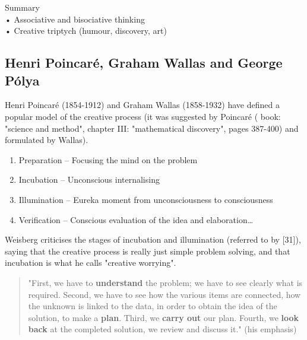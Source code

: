 \begin{shaded}
  Summary\\
  •	Associative and bisociative thinking\\
  •	Creative triptych (humour, discovery, art)
\end{shaded}

\subsection{Henri Poincaré, Graham Wallas and George Pólya}

Henri Poincaré (1854-1912) \citep{Poincare2001} and Graham Wallas (1858-1932) \citep{Wallas1926} have defined a popular model \citep{Boden2003, Koestler1964, Partridge1994} of the creative process (it was suggested by Poincaré  (\citep{Poincare2001} book: "science and method", chapter III: "mathematical discovery", pages 387-400) and formulated by Wallas).

\begin{enumerate}
  \item Preparation – Focusing the mind on the problem
  \item Incubation – Unconscious internalising
  \item Illumination – Eureka moment from unconsciousness to consciousness
  \item Verification – Conscious evaluation of the idea and elaboration…
\end{enumerate}

Weisberg criticises the stages of incubation and illumination (referred to by [31]), saying that the creative process is really just simple problem solving, and that incubation is what he calls "creative worrying".

\begin{quote}
  "First, we have to \textbf{understand} the problem; we have to see clearly what is required. Second, we have to see how the various items are connected, how the unknown is linked to the data, in order to obtain the idea of the solution, to make a \textbf{plan}. Third, we \textbf{carry out} our plan. Fourth, we \textbf{look back} at the completed solution, we review and discuss it." \citep[p.5-6]{Polya1957}(his emphasis)
\end{quote}

